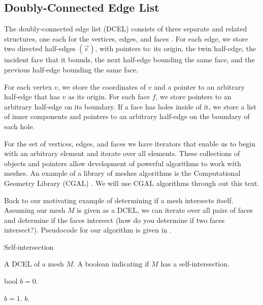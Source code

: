\subsection{Doubly-Connected Edge List}

The doubly-connected edge list (DCEL) consists of three separate and related structures, one each
for the vertices, edges, and faces \cite{dutchbook3}.
For each edge, we store two directed half-edges $(\overrightarrow{e})$, with pointers to: its origin, the twin half-edge, the incident face that it bounds, the next half-edge bounding the same face, and the previous half-edge bounding the same face.


For each vertex $v$, we store the coordinates of $v$ and a pointer to an arbitrary half-edge
that has $v$ as its origin.
For each face $f$, we store pointers to an arbitrary half-edge on its boundary. If a face has holes inside of it, we store a list of inner components and pointers to an arbitrary half-edge  on the boundary of each hole.

For the set of vertices, edges, and faces we have iterators that enable us to begin with an arbitrary element
and iterate over all elements. These collections of objects and pointers allow development of
powerful algorithms to work with meshes. An example of a library of meshes algorithms
is the Computational Geometry Library (CGAL) \cite{cgal, cgal:eb-24b}. We will use CGAL algorithms
through out this text.


Back to our motivating example of determining if a mesh intersects itself. 
Assuming our mesh $M$ is given as a DCEL, we can iterate over all pairs of faces
and determine if the faces intersect (how do you determine if two faces intersect?).
Pseudocode for our algorithm is given in .


\begin{algorithm}
 \caption{Self-intersection}\label{alg:self-intersection}
    \begin{algorithmic}[1]
      \Require A DCEL of a mesh $M.$
        \Ensure A boolean indicating if $M$ has a self-intersection.
        
        \State bool $b=0.$
	
		\State $b=1.$
	\EndIf 
	\EndFor
\EndFor
\Return $b$.
\end{algorithmic}
\end{algorithm}



